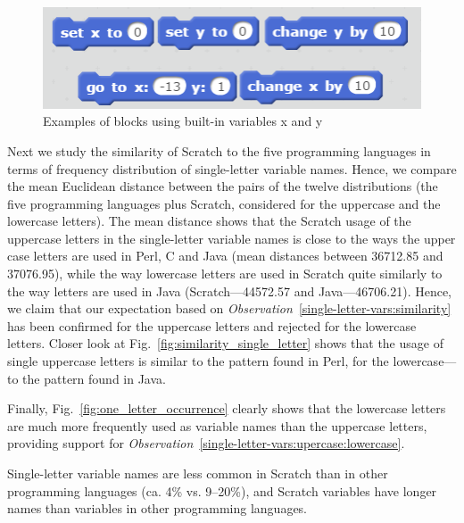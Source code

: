 \documentclass[conference]{IEEEtran}
\begin{document}
\begin{figure}[tb]
	\begin{center}
		\includegraphics[scale=0.5]{fig/builtinblocks_xy}
		\caption{Examples of blocks using built-in variables x and y}
		\label{fig:xy_Scratchblocks}
	\end{center}
\end{figure} 
Next we study the similarity of Scratch to the five programming languages in terms of frequency distribution of single-letter variable names.
Hence, we compare the mean Euclidean distance between the pairs of the twelve distributions (the five programming languages plus Scratch, considered for the uppercase and the lowercase letters).
The mean distance shows that the Scratch usage of the uppercase letters in the single-letter variable names is close to the ways the upper case letters are used in Perl, C and Java (mean distances between 36712.85 and 37076.95), while the way lowercase letters are used in Scratch quite similarly to the way letters are used in Java (Scratch---44572.57 and Java---46706.21).
Hence, we claim that our expectation based on \emph{Observation}~\ref{single-letter-vars:similarity} has been confirmed for the uppercase letters and  rejected for the lowercase letters. 
Closer look at Fig.~\ref{fig:similarity_single_letter} shows that the usage of single uppercase letters is similar to the pattern found in Perl, for the lowercase---to the pattern found in Java.

Finally, Fig.~\ref{fig:one_letter_occurrence} clearly shows that the lowercase letters are much more frequently used as variable names than the uppercase letters, providing support for \emph{Observation}~\ref{single-letter-vars:upercase:lowercase}.
\begin{framed}
	Single-letter variable names are less common in Scratch than in other programming languages (ca. 4\% vs. 9--20\%), and Scratch variables have longer names than variables in other programming languages.
\end{framed}
\end{document}
